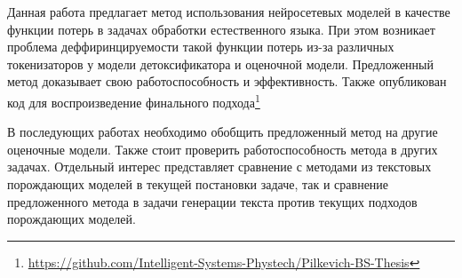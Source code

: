 Данная работа предлагает метод использования нейросетевых моделей в качестве функции потерь в задачах обработки естественного языка.
При этом возникает проблема деффиринцируемости такой функции потерь из-за различных токенизаторов у модели детоксификатора и оценочной модели.
Предложенный метод доказывает свою работоспособность и эффективность. 
Также опубликован код для воспроизведение финального подхода\footnote{\url{https://github.com/Intelligent-Systems-Phystech/Pilkevich-BS-Thesis}}

В последующих работах необходимо обобщить предложенный метод на другие оценочные модели. 
Также стоит проверить работоспособность метода в других задачах.
Отдельный интерес представляет сравнение с методами из текстовых порождающих моделей в текущей постановки задаче, так и сравнение предложенного метода в задачи генерации текста против текущих подходов порождающих моделей. 